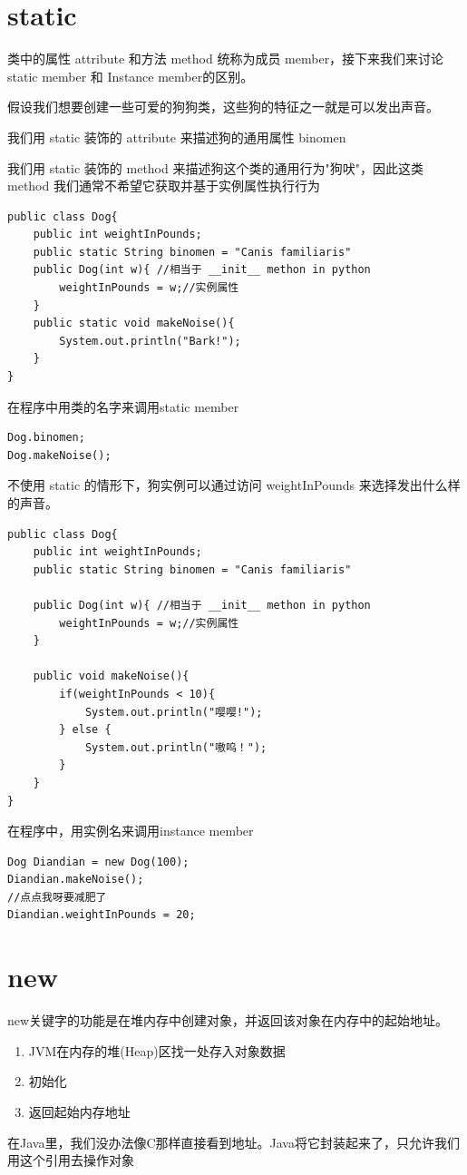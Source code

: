 \documentclass[12pt, a4paper, openany]{ctexbook} %
\begin{document}
\section{static}
类中的属性 attribute 和方法 method 统称为成员 member，接下来我们来讨论 static member 和 Instance member的区别。\par
假设我们想要创建一些可爱的狗狗类，这些狗的特征之一就是可以发出声音。\par
我们用 static 装饰的 attribute 来描述狗的通用属性 binomen\par
我们用 static 装饰的 method 来描述狗这个类的通用行为"狗吠"，因此这类 method 我们通常不希望它获取并基于实例属性执行行为
\begin{lstlisting}[caption={Dog.java}]
public class Dog{
    public int weightInPounds;
    public static String binomen = "Canis familiaris"
    public Dog(int w){ //相当于 __init__ methon in python
        weightInPounds = w;//实例属性
    }
    public static void makeNoise(){
        System.out.println("Bark!");
    }
}
\end{lstlisting}
在程序中用类的名字来调用static member
\begin{lstlisting}[caption={Dog.java}]
Dog.binomen;
Dog.makeNoise();
\end{lstlisting}

不使用 static 的情形下，狗实例可以通过访问 weightInPounds 来选择发出什么样的声音。
\begin{lstlisting}[caption={Dog.java}]
public class Dog{
    public int weightInPounds;
    public static String binomen = "Canis familiaris"

    public Dog(int w){ //相当于 __init__ methon in python
        weightInPounds = w;//实例属性
    }

    public void makeNoise(){
        if(weightInPounds < 10){
            System.out.println("嘤嘤!");
        } else {
            System.out.println("嗷呜！");
        }
    }
}
\end{lstlisting}\par

在程序中，用实例名来调用instance member
\begin{lstlisting}[caption={Dog.java}]
Dog Diandian = new Dog(100);
Diandian.makeNoise();
//点点我呀要减肥了
Diandian.weightInPounds = 20;
\end{lstlisting}

\section{new}
new关键字的功能是在堆内存中创建对象，并返回该对象在内存中的起始地址。
\begin{enumerate}
    \item JVM在内存的堆(Heap)区找一处存入对象数据
    \item 初始化
    \item 返回起始内存地址
\end{enumerate}
\par
在Java里，我们没办法像C那样直接看到地址。Java将它封装起来了，只允许我们用这个引用去操作对象
\end{document}
